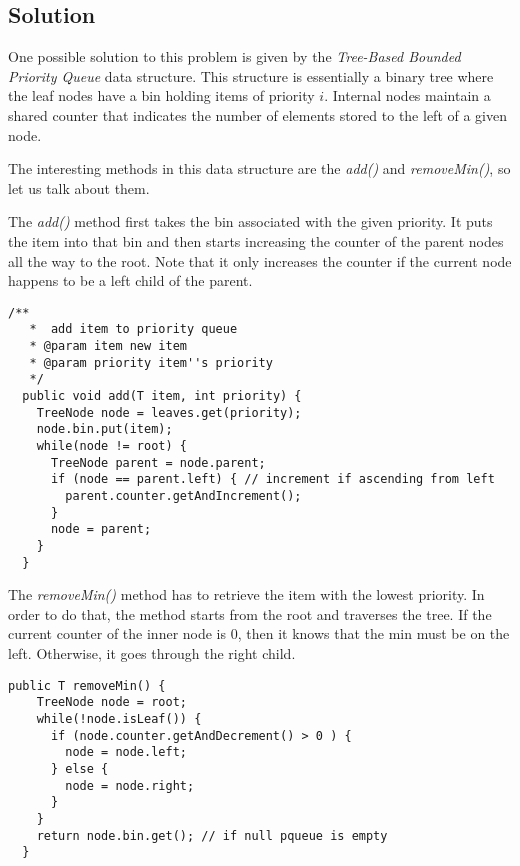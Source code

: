 \subsection{Solution}
\par
One possible solution to this problem is given by the \textit{Tree-Based Bounded
Priority Queue} data structure. This structure is essentially a binary tree where
the leaf nodes have a bin holding items of priority $i$. Internal nodes maintain
a shared counter that indicates the number of elements stored to the left of
a given node.
\par
The interesting methods in this data structure are the \textit{add()} and
\textit{removeMin()}, so let us talk about them.
\par
The \textit{add()} method first takes the bin associated with the given
priority. It puts the item into that bin and then starts increasing the counter
of the parent nodes all the way to the root. Note that it only increases the
counter if the current node happens to be a left child of the parent.
\par
\hfill
\begin{lstlisting}[style=numbers]
  /**
   *  add item to priority queue
   * @param item new item
   * @param priority item''s priority
   */
  public void add(T item, int priority) {
    TreeNode node = leaves.get(priority);
    node.bin.put(item);
    while(node != root) {
      TreeNode parent = node.parent;
      if (node == parent.left) { // increment if ascending from left
        parent.counter.getAndIncrement();
      }
      node = parent;
    }
  }
\end{lstlisting}
\hfill
\par
The \textit{removeMin()} method has to retrieve the item with the lowest
priority. In order to do that, the method starts from the root and traverses the
tree. If the current counter of the inner node is $0$, then it knows that the
min must be on the left. Otherwise, it goes through the right child. 
\par
\hfill
\begin{lstlisting}[style=numbers]
  public T removeMin() {
    TreeNode node = root;
    while(!node.isLeaf()) {
      if (node.counter.getAndDecrement() > 0 ) {
        node = node.left;
      } else {
        node = node.right;
      }
    }
    return node.bin.get(); // if null pqueue is empty
  }
\end{lstlisting}
\hfill
\par
